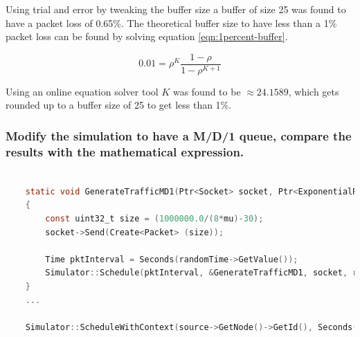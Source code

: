 \documentclass{article}
\begin{document}
    Using trial and error by tweaking the buffer size a buffer of size 25 was found to have a packet loss of 0.65\%. The theoretical buffer size to have less than a 1\% packet loss can be found by solving equation \ref{eqn:1percent-buffer}.

    \begin{equation}
    \label{eqn:1percent-buffer}
        0.01 = \rho^K\frac{1-\rho}{1-\rho^{K+1}}
    \end{equation}

    Using an online equation solver tool \cite{wolfram} $K$ was found to be $\approx24.1589$, which gets rounded up to a buffer size of 25 to get less than 1\%.

    \subsubsection*{Modify the simulation to have a M/D/1 queue, compare the results with the mathematical expression.}

    \begin{lstlisting}[language=C]

    static void GenerateTrafficMD1(Ptr<Socket> socket, Ptr<ExponentialRandomVariable> randomTime, double mu) 
    {
        const uint32_t size = (1000000.0/(8*mu)-30);
        socket->Send(Create<Packet> (size));
    
        Time pktInterval = Seconds(randomTime->GetValue());
        Simulator::Schedule(pktInterval, &GenerateTrafficMD1, socket, randomTime, mu);
    }
    ...    

    Simulator::ScheduleWithContext(source->GetNode()->GetId(), Seconds(1.0), &GenerateTrafficMD1, source, randomTime, mu);
    \end{lstlisting}

    \newpage
    \printbibliography
\end{document}
